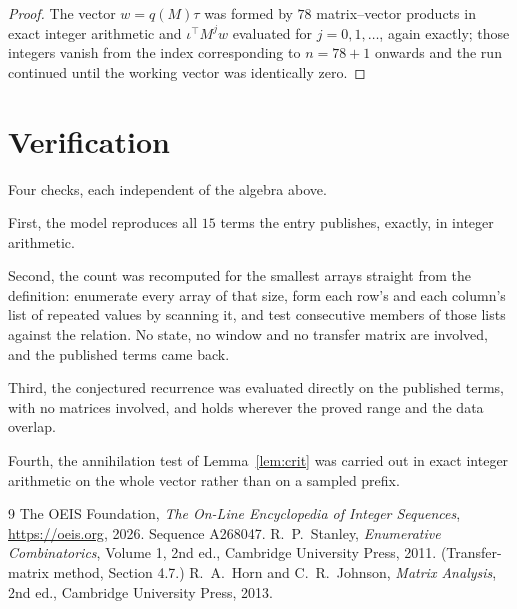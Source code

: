 \documentclass[11pt,a4paper]{article}
\theoremstyle{plain}
\theoremstyle{definition}
\begin{document}
\begin{proof}
The vector $w=q(M)\tau$ was formed by $78$ matrix--vector products in exact integer
arithmetic and $\iota^{\!\top}M^{j}w$ evaluated for $j=0,1,\dots$, again exactly; those
integers vanish from the index corresponding to $n=78+1$ onwards and the run continued
until the working vector was identically zero.
\end{proof}

\section{Verification}

Four checks, each independent of the algebra above.

First, the model reproduces all $15$ terms the entry publishes, exactly, in integer
arithmetic.

Second, the count was recomputed for the smallest arrays straight from the definition:
enumerate every array of that size, form each row's and each column's list of repeated values
by scanning it, and test consecutive members of those lists against the relation. No state, no
window and no transfer matrix are involved, and the published terms came back.

Third, the conjectured recurrence was evaluated directly on the published terms, with no
matrices involved, and holds wherever the proved range and the data overlap.

Fourth, the annihilation test of Lemma~\ref{lem:crit} was carried out in exact integer
arithmetic on the whole vector rather than on a sampled prefix.

\begin{thebibliography}{9}
 The OEIS Foundation, \emph{The On-Line Encyclopedia of Integer
Sequences}, \url{https://oeis.org}, 2026. Sequence A268047.
 R.~P.~Stanley, \emph{Enumerative Combinatorics}, Volume 1, 2nd ed.,
Cambridge University Press, 2011. (Transfer-matrix method, Section 4.7.)
 R.~A.~Horn and C.~R.~Johnson, \emph{Matrix Analysis}, 2nd ed., Cambridge
University Press, 2013.
\end{thebibliography}
\end{document}
